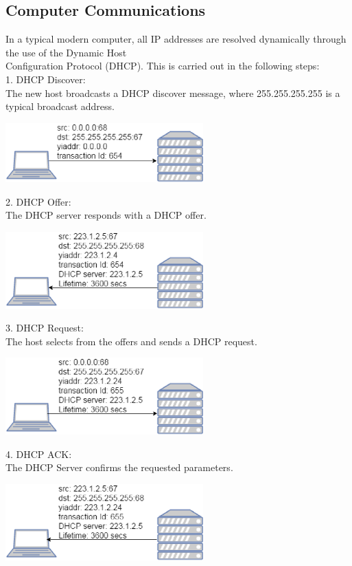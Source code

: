 \documentclass{acm_proc_article-sp}
\begin{document}
\subsection{Computer Communications}
In a typical modern computer, all IP addresses are resolved dynamically through the use of the Dynamic Host \\Configuration Protocol (DHCP). This is carried out in the following steps\cite{kurose:networking}: \\

1. DHCP Discover: \\
The new host broadcasts a DHCP discover message, where 255.255.255.255 is a typical broadcast address.  

\includegraphics[width=3in]{DHCP_Discover.eps}

2. DHCP Offer: \\
The DHCP server responds with a DHCP offer. 

\includegraphics[width=3in]{DHCP_Offer.eps}

3. DHCP Request: \\
The host selects from the offers and sends a DHCP request. 

\includegraphics[width=3in]{DHCP_Request.eps}

4. DHCP ACK: \\ 
The DHCP Server confirms the requested parameters. 

\includegraphics[width=3in]{DHCP_Ack.eps}
\end{document}
